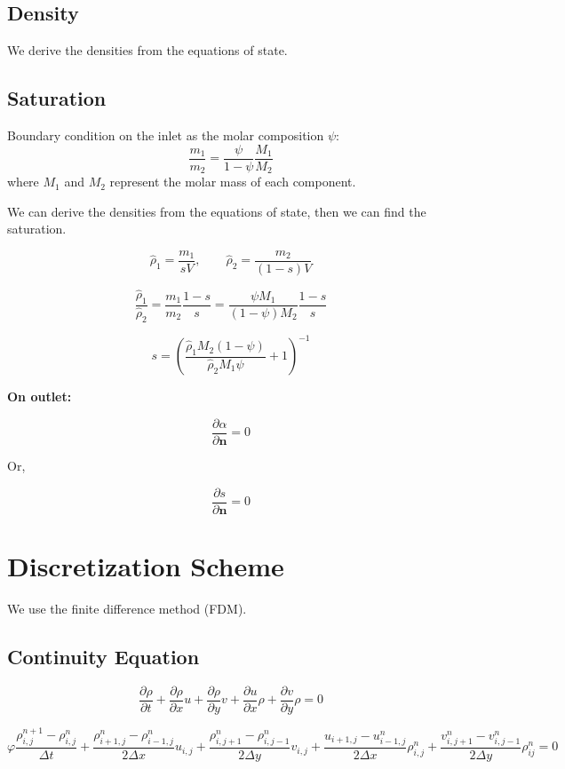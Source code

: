 \documentclass[a4paper,12pt]{article}
\begin{document}
\subsection{Density}

We derive the densities from the equations of state.

\subsection{Saturation}
    Boundary condition on the inlet as the molar
    composition \(\psi\):
    \[
        \frac{m_1}{m_2} = \frac{\psi}{1 - \psi}
        \frac{M_1}{M_2}
    \] 
    where \(M_1\) and \(M_2\) represent the molar mass 
    of each component.

    We can derive the densities from the equations of state,
    then we can find the saturation.

    \[
    \hat \rho_1 = \frac{m_1}{sV}, \qquad
    \hat \rho_2 = \frac{m_2}{(1 - s)V}
    \] 

    \[
    \frac{\hat \rho_1}{\hat \rho_2} = \frac{m_1}{m_2}
    \frac{1 - s}{s}
    = \frac{\psi M_1}{(1 - \psi) M_2}\frac{1 - s}{s}
    \] 

    \[
        s = \left( 
        \frac{\hat \rho_1 M_2(1 - \psi) }{\hat \rho_2 M_1 \psi}
    + 1 \right)^{-1}
    \] 

    \textbf{On outlet:}

    \[
    \frac{\partial \alpha}{\partial \bm{n}} = 0
    \] 

    Or,

    \[
    \frac{\partial s}{\partial \bm{n}} = 0 
    \] 

\section{Discretization Scheme}

We use the finite difference method (FDM).

\subsection{Continuity Equation}

\[
\frac{\partial \rho}{\partial t}
+ \frac{\partial \rho}{\partial x} u
+ \frac{\partial \rho}{\partial y} v
+ \frac{\partial u}{\partial x} \rho
+ \frac{\partial v}{\partial y} \rho = 0
\] 

\[
\varphi \frac{\rho^{n + 1}_{i, j} - \rho^n_{i, j}}{\Delta t}
+ \frac{\rho_{i+1, j}^n - \rho_{i-1,j}^n}{2\Delta x} u_{i,j}
+ \frac{\rho_{i, j+1}^n - \rho_{i,j-1}^n}{2\Delta y} v_{i,j}
+ \frac{u_{i+1, j} - u_{i-1,j}^n}{2\Delta x} \rho_{i,j}^n
+ \frac{v_{i, j+1}^n - v_{i,j-1}^n}{2\Delta y} \rho_{ij}^n = 0
\] 
\end{document}
